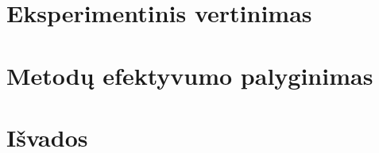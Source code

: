 \documentclass[11pt,a4paper]{article}
\begin{document}
\section{Eksperimentinis vertinimas}
\label{sec:vertinimas}


\section{Metodų efektyvumo palyginimas}
\label{sec:palyginimas}


\section{Išvados}


\newpage
%
%
{}

\end{document}
